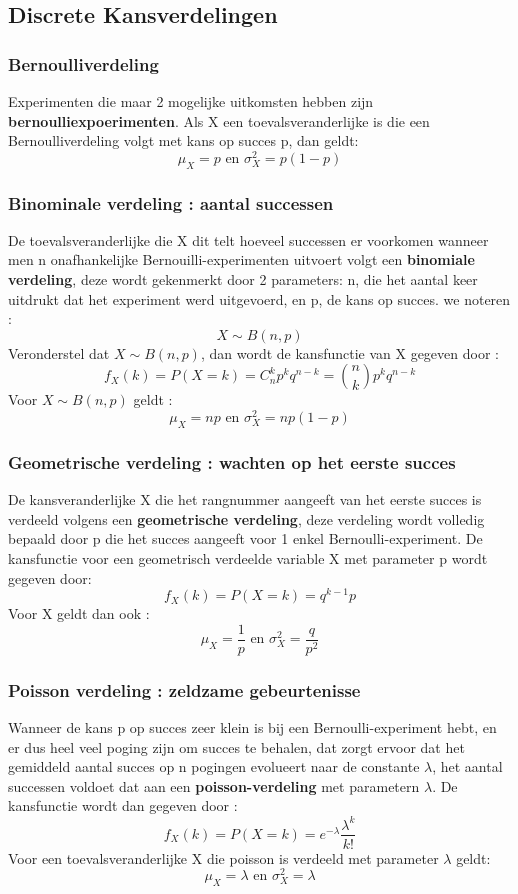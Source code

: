 \documentclass{report}
\begin{document}
	  		\subsection{Discrete Kansverdelingen}
	  			\subsubsection{Bernoulliverdeling}
	  				Experimenten die maar 2 mogelijke uitkomsten hebben zijn \textbf{bernoulliexpoerimenten}. Als X een toevalsveranderlijke is die een Bernoulliverdeling volgt met kans op succes p, dan geldt: 
	  				\[\mu_X = p \textrm{ en } \sigma_X^2 = p (1 - p)\]
	  			\subsubsection{Binominale verdeling : aantal successen}
	  				De toevalsveranderlijke die X dit telt hoeveel successen er voorkomen wanneer men n onafhankelijke Bernouilli-experimenten uitvoert volgt een \textbf{binomiale verdeling}, deze wordt gekenmerkt door 2 parameters: n, die het aantal keer uitdrukt dat het experiment werd uitgevoerd, en p, de kans op succes. we noteren : 
	  				\[X \sim B(n, p)\]
	  				Veronderstel dat \(X \sim B(n, p)\), dan wordt de kansfunctie van X gegeven door : 
	  				\[f_X(k) = P(X = k) = C_n^kp^kq^{n - k} = \binom{n}{k}p^kq^{n - k}\]
	  				Voor \(X \sim B(n, p)\) geldt : 
	  				\[\mu_X = np \textrm{ en } \sigma_X^2 = np(1 - p)\]
	  			\subsubsection{Geometrische verdeling : wachten op het eerste succes}
	  				De kansveranderlijke X die het rangnummer aangeeft van het eerste succes is verdeeld volgens een \textbf{geometrische verdeling}, deze verdeling wordt volledig bepaald door p die het succes aangeeft voor 1 enkel Bernoulli-experiment.
	  				De kansfunctie voor een geometrisch verdeelde variable X met parameter p wordt gegeven door: 
	  				\[f_X(k) = P(X = k) = q^{k - 1}p\]
	  				Voor X geldt dan ook : 
	  				\[	\mu_X = \frac{1}{p} \textrm{ en } \sigma_X^2 = \frac{q}{p^2}\]
	  			\subsubsection{Poisson verdeling : zeldzame gebeurtenisse}
	  				Wanneer de kans p op succes zeer klein is bij een Bernoulli-experiment hebt, en er dus heel veel poging zijn om succes te behalen, dat zorgt ervoor dat het gemiddeld aantal succes op n pogingen evolueert naar de constante \(\lambda\), het aantal successen voldoet dat aan een \textbf{poisson-verdeling} met parametern \(\lambda\). De kansfunctie wordt dan gegeven door : 
	  				\[
	  				f_X(k) = P(X = k) = e^{-\lambda}\frac{\lambda^k}{k!}\]
	  				Voor een toevalsveranderlijke X die poisson is verdeeld met parameter \(\lambda\) geldt: 
	  				\[	\mu_X = \lambda \textrm{ en } \sigma_X^2 = \lambda\]
\end{document}

